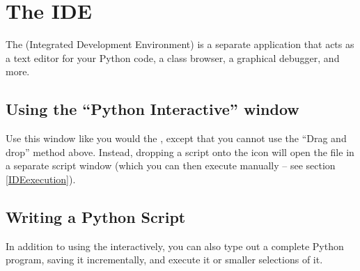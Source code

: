  



\section{The IDE\label{IDE}}

The  (Integrated Development Environment) is a
separate application that acts as a text editor for your Python code,
a class browser, a graphical debugger, and more.


\subsection{Using the ``Python Interactive'' window}

Use this window like you would the , except
that you cannot use the ``Drag and drop'' method above. Instead,
dropping a script onto the  icon will open the
file in a separate script window (which you can then execute manually
-- see section \ref{IDEexecution}).


\subsection{Writing a Python Script \label{IDEwrite}}

In addition to using the  interactively, you can
also type out a complete Python program, saving it incrementally, and
execute it or smaller selections of it.

